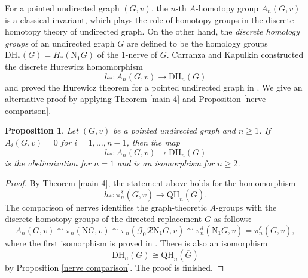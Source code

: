 \documentclass[oneside, 12pt]{amsart}
\numberwithin{equation}{section}
\theoremstyle{plain}
\newtheorem{proposition}[theorem]{Proposition}
\theoremstyle{definition}
\theoremstyle{remark}
\begin{document}
	For a pointed undirected graph $(G,v)$, the $n$-th $A$-homotopy group $A_n(G,v)$ is a classical invariant, which plays the role of homotopy groups in the discrete homotopy theory of undirected graph. On the other hand, the \emph{discrete homology groups} of an undirected graph $G$ are defined to be the homology groups $\mathrm{DH}_*(G)=H_*(\mathrm{N}_1G)$ of the 1-nerve of $G$. Carranza and Kapulkin \cite{CK2} constructed the discrete Hurewicz homomorphism
	\[
	h_*\colon A_n(G,v)\to \mathrm{DH}_n(G)
	\]
	and proved the Hurewicz theorem for a pointed undirected graph in \cite{CK2}. We give an alternative proof by applying Theorem \ref{main 4} and Proposition \ref{nerve comparison}.
	\begin{proposition}
		\label{Hurewicz theorem graph}
		Let $(G,v)$ be a pointed undirected graph and $n\ge1$. If $A_i(G,v)=0$ for $i=1,\ldots,n-1$, then the map
		\[
		h_*\colon A_n(G,v)\to \mathrm{DH}_n(G)
		\]
		is the abelianization for $n=1$ and is an isomorphism for $n\ge2$.
	\end{proposition}
	\begin{proof}
		By Theorem \ref{main 4}, the statement above holds for the homomorphism
		\[
		h_*\colon\pi_n^\delta(\overline{G},v)\to \mathrm{QH}_n(\overline{G}).
		\]
		The comparison of nerves identifies the graph-theoretic $A$-groups with the discrete homotopy groups of the directed replacement $\overline{G}$ as follows:
		\[
		A_n(G,v)\cong\pi_n(\mathrm{N}G,v)\cong\pi_n(\mathcal{G}_0\mathcal{R}\mathrm{N}_1\overline{G},v)\cong\pi_n^\delta(\mathrm{N}_1\overline{G},v)=\pi_n^\delta(\overline{G},v),
		\]
		where the first isomorphism is proved in \cite{CK2}. There is also an isomorphism
		\[
		\mathrm{DH}_n(G)\cong \mathrm{QH}_n(\overline{G})
		\]
		by Proposition \ref{nerve comparison}. The proof is finished.
	\end{proof}
	
\end{document}
